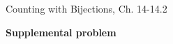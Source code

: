 \documentclass[handout]{mcs}
\begin{document}

\begin{staffnotes}
Counting with Bijections, Ch. 14-14.2
\end{staffnotes}



\newpage

\begin{center}
\textbf{\large Supplemental problem}
\end{center}



\end{document}
